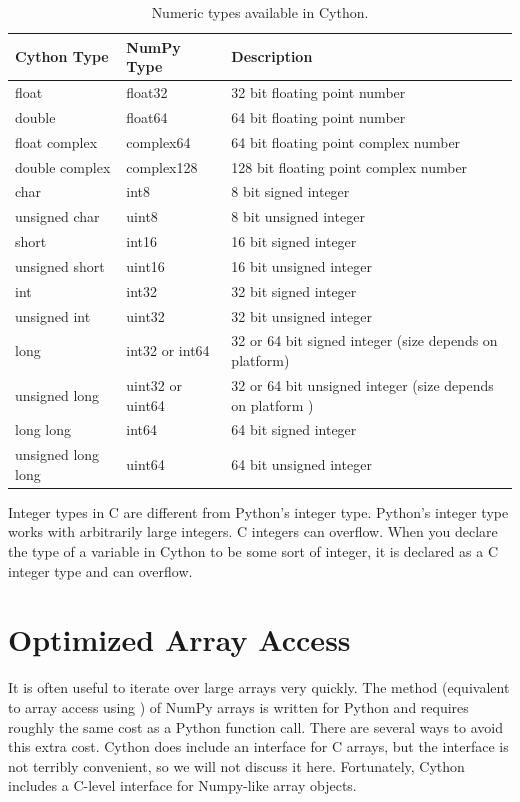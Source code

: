 \begin{table}
\begin{center}
\begin{tabular}{|p{2.8cm}|p{2.5cm}|p{6cm}|}
\hline
Cython Type & NumPy Type& Description \\
\hline
float & float32 & 32 bit floating point number \\
double & float64 & 64 bit floating point number \\
float complex & complex64 & 64 bit floating point complex number \\
double complex & complex128 & 128 bit floating point complex number \\
char & int8 & 8 bit signed integer \\
unsigned char & uint8 & 8 bit unsigned integer \\
short & int16 & 16 bit signed integer \\
unsigned short & uint16 & 16 bit unsigned integer \\
int & int32 & 32 bit signed integer \\
unsigned int & uint32 & 32 bit unsigned integer \\
long & int32 or int64 & 32 or 64 bit signed integer (size depends on platform) \\
unsigned long & uint32 or uint64 & 32 or 64 bit unsigned integer (size depends on platform ) \\
long long & int64 & 64 bit signed integer \\
unsigned long long & uint64 & 64 bit unsigned integer \\
\hline
\end{tabular}
\end{center}
\caption{Numeric types available in Cython.}
\label{table:cython_types}
\end{table}

\begin{warn}
Integer types in C are different from Python's integer type.
Python's integer type works with arbitrarily large integers.
C integers can overflow.
When you declare the type of a variable in Cython to be some sort of integer, it is declared as a C integer type and can overflow.
\end{warn}

\section*{Optimized Array Access}
It is often useful to iterate over large arrays very quickly.
The  method (equivalent to array access using \li{[ ]}) of NumPy arrays is written for Python and requires roughly the same cost as a Python function call.
There are several ways to avoid this extra cost.
Cython does include an interface for C arrays, but the interface is not terribly convenient, so we will not discuss it here.
Fortunately, Cython includes a C-level interface for Numpy-like array objects.

